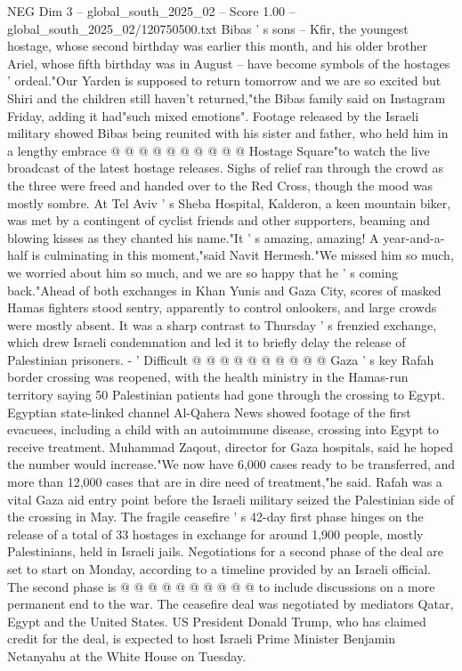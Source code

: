 \begin{textsample}{NEG Dim 3 – global\_south\_2025\_02 – Score 1.00 – global\_south\_2025\_02/120750500.txt}
Bibas ' s sons -- Kfir, the youngest hostage, whose second birthday was earlier this month, and his older brother Ariel, whose fifth birthday was in August -- have become symbols of the hostages ' ordeal."Our Yarden is supposed to return tomorrow and we are so excited but Shiri and the children still haven't returned,"the Bibas family said on Instagram Friday, adding it had"such mixed emotions".
Footage released by the Israeli military showed Bibas being reunited with his sister and father, who held him in a lengthy embrace @ @ @ @ @ @ @ @ @ @ Hostage Square"to watch the live broadcast of the latest hostage releases.
Sighs of relief ran through the crowd as the three were freed and handed over to the Red Cross, though the mood was mostly sombre.
At Tel Aviv ' s Sheba Hospital, Kalderon, a keen mountain biker, was met by a contingent of cyclist friends and other supporters, beaming and blowing kisses as they chanted his name."It ' s amazing, amazing!
A year-and-a-half is culminating in this moment,"said Navit Hermesh."We missed him so much, we worried about him so much, and we are so happy that he ' s coming back."Ahead of both exchanges in Khan Yunis and Gaza City, scores of masked Hamas fighters stood sentry, apparently to control onlookers, and large crowds were mostly absent.
It was a sharp contrast to Thursday ' s frenzied exchange, which drew Israeli condemnation and led it to briefly delay the release of Palestinian prisoners. - ' Difficult @ @ @ @ @ @ @ @ @ @ Gaza ' s key Rafah border crossing was reopened, with the health ministry in the Hamas-run territory saying 50 Palestinian patients had gone through the crossing to Egypt.
Egyptian state-linked channel Al-Qahera News showed footage of the first evacuees, including a child with an autoimmune disease, crossing into Egypt to receive treatment.
Muhammad Zaqout, director for Gaza hospitals, said he hoped the number would increase."We now have 6,000 cases ready to be transferred, and more than 12,000 cases that are in dire need of treatment,"he said.
Rafah was a vital Gaza aid entry point before the Israeli military seized the Palestinian side of the crossing in May.
The fragile ceasefire ' s 42-day first phase hinges on the release of a total of 33 hostages in exchange for around 1,900 people, mostly Palestinians, held in Israeli jails.
Negotiations for a second phase of the deal are set to start on Monday, according to a timeline provided by an Israeli official.
The second phase is @ @ @ @ @ @ @ @ @ @ to include discussions on a more permanent end to the war.
The ceasefire deal was negotiated by mediators Qatar, Egypt and the United States.
US President Donald Trump, who has claimed credit for the deal, is expected to host Israeli Prime Minister Benjamin Netanyahu at the White House on Tuesday.

\end{textsample}
